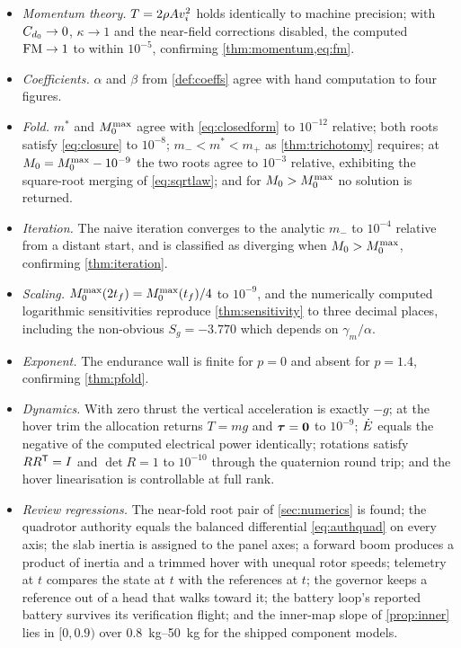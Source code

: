 \begin{itemize}[nosep]
  \item \emph{Momentum theory.} $T = 2\rho Av_i^2$ holds identically to
        machine precision; with $C_{d_0}\to0$, $\kappa\to1$ and the near-field
        corrections disabled, the computed $\mathrm{FM}\to1$ to within $10^{-5}$,
        confirming \cref{thm:momentum,eq:fm}.
  \item \emph{Coefficients.} $\alpha$ and $\beta$ from \cref{def:coeffs} agree
        with hand computation to four figures.
  \item \emph{Fold.} $m^*$ and $M_0^{\max}$ agree with \cref{eq:closedform} to
        $10^{-12}$ relative; both roots satisfy \cref{eq:closure} to $10^{-8}$;
        $m_-<m^*<m_+$ as \cref{thm:trichotomy} requires; at
        $M_0=M_0^{\max}-10^{-9}$ the two roots agree to $10^{-3}$ relative,
        exhibiting the square-root merging of \cref{eq:sqrtlaw}; and for
        $M_0>M_0^{\max}$ no solution is returned.
  \item \emph{Iteration.} The naive iteration converges to the analytic $m_-$
        to $10^{-4}$ relative from a distant start, and is classified as
        diverging when $M_0>M_0^{\max}$, confirming \cref{thm:iteration}.
  \item \emph{Scaling.} $M_0^{\max}(2t_f) = M_0^{\max}(t_f)/4$ to $10^{-9}$, and the
        numerically computed logarithmic sensitivities reproduce
        \cref{thm:sensitivity} to three decimal places, including the
        non-obvious $S_g=-3.770$ which depends on $\gamma_m/\alpha$.
  \item \emph{Exponent.} The endurance wall is finite for $p=0$ and absent for
        $p=1.4$, confirming \cref{thm:pfold}.
  \item \emph{Dynamics.} With zero thrust the vertical acceleration is exactly
        $-g$; at the hover trim the allocation returns $T=mg$ and
        $\bm{\tau}=\bm{0}$ to $10^{-9}$; $\dot{E}$ equals the negative of the
        computed electrical power identically; rotations satisfy
        $RR^{\mathsf{T}}=I$ and $\det R=1$ to $10^{-10}$ through the quaternion
        round trip; and the hover linearisation is controllable at full rank.
  \item \emph{Review regressions.} The near-fold root pair of
        \cref{sec:numerics} is found; the quadrotor authority equals the
        balanced differential \cref{eq:authquad} on every axis; the slab
        inertia is assigned to the panel axes; a forward boom produces a
        product of inertia and a trimmed hover with unequal rotor speeds;
        telemetry at $t$ compares the state at $t$ with the references at $t$;
        the governor keeps a reference out of a head that walks toward it;
        the battery loop's reported battery survives its verification flight;
        and the inner-map slope of \cref{prop:inner} lies in $[0,0.9)$ over
        \SIrange{0.8}{50}{\kilo\gram} for the shipped component models.
\end{itemize}

